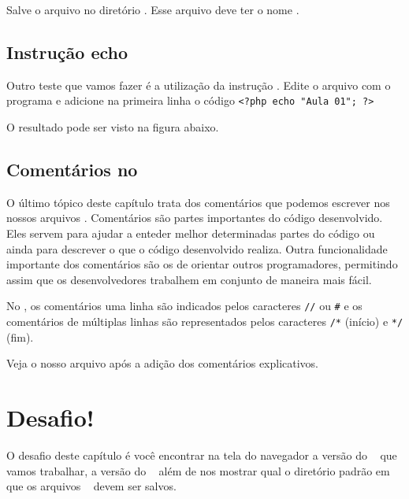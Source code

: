 Salve o arquivo no diretório . Esse arquivo deve ter o nome .


\subsection{Instrução echo}
\label{subsection:funcao-echo}
Outro teste que vamos fazer é a utilização da instrução \funcaoecho. Edite o arquivo 
 com o programa \gedit e adicione na primeira linha o código
\texttt{<?php echo "Aula 01"; ?>}



O resultado pode ser visto na figura abaixo.

\subsection{Comentários no \php}
\label{subsection:comentarios-no-php}

O último tópico deste capítulo trata dos comentários que podemos escrever nos nossos
arquivos \phpextensao. Comentários são partes importantes do código desenvolvido.
Eles servem para ajudar a enteder melhor determinadas partes do código ou ainda
para descrever o que o código desenvolvido realiza. Outra funcionalidade
importante dos comentários são os de orientar outros programadores, permitindo assim
que os desenvolvedores trabalhem em conjunto de maneira mais fácil.

No \php, os comentários uma linha são indicados pelos caracteres \verb$//$ ou \verb$#$
e os comentários de múltiplas linhas são representados pelos caracteres 
\verb$/*$ (início) e \verb$*/$ (fim).

Veja o nosso arquivo  após a adição dos comentários explicativos.



\section{Desafio!}
\label{desafio}
O desafio deste capítulo é você encontrar na tela do navegador a versão do \php~
que vamos trabalhar, a versão do \apache~ além de nos mostrar qual o diretório
padrão em que os arquivos \phpextensao~ devem ser salvos.